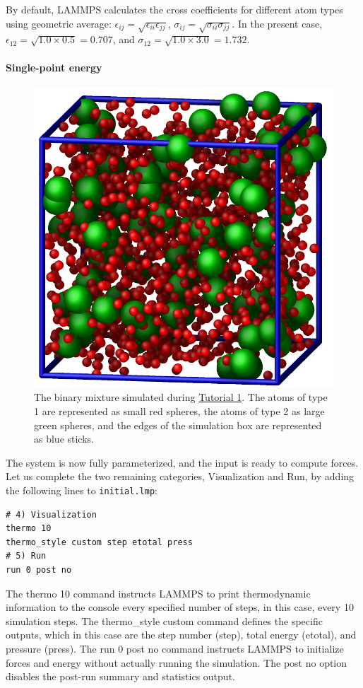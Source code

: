 \documentclass[9pt,tutorial]{livecoms}
\newcommand{\lmpcmd}[1]{\hspace{0pt}\colorbox{listing}{\textcolor{command}{\small{#1}}}\hspace{0pt}} %
\newcommand{\flecmd}[1]{\textcolor{command}{\texttt{#1}}} %
\begin{document}
\begin{note}
By default, LAMMPS calculates the cross coefficients for different atom
types using geometric average: $\epsilon_{ij} = \sqrt{\epsilon_{ii} \epsilon_{jj}}$,
$\sigma_{ij} = \sqrt{\sigma_{ii} \sigma_{jj}}$.  In the present case,
$\epsilon_{12} = \sqrt{1.0 \times 0.5} = 0.707$, and
$\sigma_{12} = \sqrt{1.0 \times 3.0} = 1.732$.
\end{note}

\paragraph{Single-point energy}

\begin{figure}
\centering
\includegraphics[width=0.55\linewidth]{LJ}
\caption{The binary mixture simulated during \hyperref[lennard-jones-label]{Tutorial 1}.
  The atoms of type 1 are represented as small red spheres, the atoms of type 2 as large
  green spheres, and the edges of the simulation box are represented as blue sticks.}
\label{fig:LJ}
\end{figure}

The system is now fully parameterized, and the input is ready to compute
forces.  Let us complete the two remaining categories,
\lmpcmd{Visualization} and \lmpcmd{Run}, by adding the following lines
to \flecmd{initial.lmp}:
\begin{lstlisting}
# 4) Visualization
thermo 10
thermo_style custom step etotal press
# 5) Run
run 0 post no
\end{lstlisting}
The \lmpcmd{thermo 10} command instructs LAMMPS to print thermodynamic
information to the console every specified number of steps, in this case,
every 10 simulation steps.  The \lmpcmd{thermo\_style custom} command
defines the specific outputs, which in this case are the step number
(\lmpcmd{step}), total energy (\lmpcmd{etotal}), and pressure (\lmpcmd{press}).
The \lmpcmd{run 0 post no} command instructs LAMMPS to initialize forces and energy
without actually running the simulation.  The \lmpcmd{post no} option disables
the post-run summary and statistics output.
\end{document}
